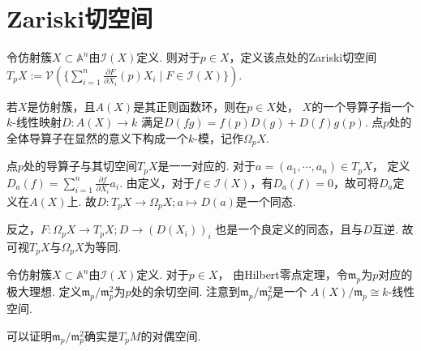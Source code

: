 \section{Zariski切空间}
    \begin{definition}
        令仿射簇$X \subset \mathbb{A}^{n}$由$\mathcal{I}(X)$定义. 
        则对于$p \in X$，定义该点处的Zariski切空间
        $T_{p}X:=\mathcal{V}(\{\sum_{i=1}^{n}\frac{\partial F}{\partial X_{i}}(p)X_{i}\mid F \in \mathcal{I}(X)\})$.
    \end{definition}

    \begin{definition}
        若$X$是仿射簇，且$A(X)$是其正则函数环，则在$p \in X$处，
        $X$的一个导算子指一个$k$-线性映射$D\colon A(X) \rightarrow k$
        满足$D(fg)=f(p)D(g)+D(f)g(p)$. 
        点$p$处的全体导算子在显然的意义下构成一个$k$-模，记作$\Omega_{p}X$.
    \end{definition}

    点$p$处的导算子与其切空间$T_{p}X$是一一对应的. 
    对于$a=(a_{1},\cdots,a_{n}) \in T_{p}X$，
    定义$D_{a}(f)=\sum_{i=1}^{n}\frac{\partial f}{\partial X_{i}}a_{i}$. 
    由定义，对于$f \in \mathcal{I}(X)$，有$D_{a}(f)=0$，故可将$D_{a}$定义在$A(X)$上. 
    故$D\colon T_{p}X \rightarrow \Omega_{p}X;a \mapsto D(a)$是一个同态.

    反之，$F\colon\Omega_{p}X \rightarrow T_{p}X;D \rightarrow (D(X_{i}))_{i}$
    也是一个良定义的同态，且与$D$互逆. 故可视$T_{p}X$与$\Omega_{p}X$为等同.

    \begin{definition}
        令仿射簇$X \subset \mathbb{A}^{n}$由$\mathcal{I}(X)$定义. 对于$p \in X$，
        由Hilbert零点定理，令$\mathfrak{m}_{p}$为$p$对应的极大理想. 
        定义$\mathfrak{m}_{p}/\mathfrak{m}_{p}^{2}$为$p$处的余切空间.
        注意到$\mathfrak{m}_{p}/\mathfrak{m}_{p}^{2}$是一个
        $A(X)/\mathfrak{m}_{p} \cong k$-线性空间. 
    \end{definition}

    可以证明$\mathfrak{m}_{p}/\mathfrak{m}_{p}^{2}$确实是$T_{p}M$的对偶空间.

